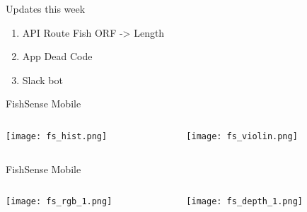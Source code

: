 

\begin{frame}{Updates this week}
    \begin{enumerate}
        \item API Route Fish ORF -> Length
        \item App Dead Code
        \item Slack bot
    \end{enumerate}
\end{frame}

\begin{frame}{FishSense Mobile}
     \begin{columns}
         \begin{column}{0.5\textwidth}
             \centering
             \texttt{[image: fs\_hist.png]}
         \end{column}
         \begin{column}{0.5\textwidth}
             \centering
             \texttt{[image: fs\_violin.png]}
         \end{column}
     \end{columns}
\end{frame}

\begin{frame}{FishSense Mobile}
     \begin{columns}
         \begin{column}{0.5\textwidth}
             \centering
             \texttt{[image: fs\_rgb\_1.png]}
         \end{column}
         \begin{column}{0.5\textwidth}
             \centering
             \texttt{[image: fs\_depth\_1.png]}
         \end{column}
     \end{columns}
\end{frame}

